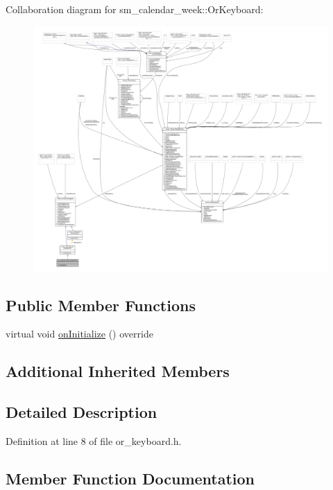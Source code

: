 Collaboration diagram for sm\+\_\+calendar\+\_\+week\+:\+:Or\+Keyboard\+:
\nopagebreak
\begin{figure}[H]
\begin{center}
\leavevmode
\includegraphics[width=350pt]{classsm__calendar__week_1_1OrKeyboard__coll__graph}
\end{center}
\end{figure}
\subsection*{Public Member Functions}
\begin{DoxyCompactItemize}
\item 
virtual void \hyperlink{classsm__calendar__week_1_1OrKeyboard_ab121ed865536455b8ac6fe784a50e7fc}{on\+Initialize} () override
\end{DoxyCompactItemize}
\subsection*{Additional Inherited Members}


\subsection{Detailed Description}


Definition at line 8 of file or\+\_\+keyboard.\+h.



\subsection{Member Function Documentation}
